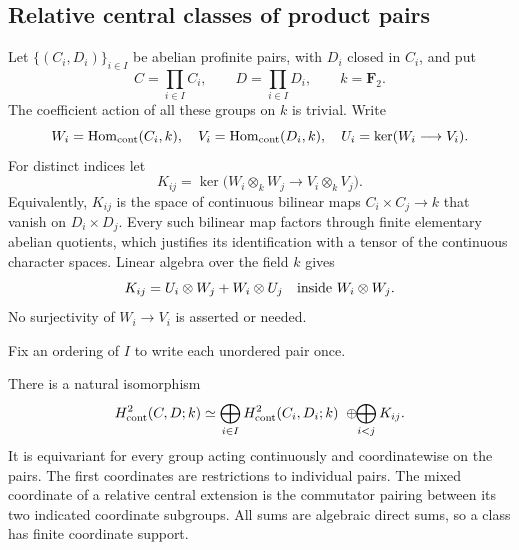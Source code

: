 \subsection{Relative central classes of product pairs}
\label{sec:cm-cross-prime-central}

Let \(\{(C_i,D_i)\}_{i\in I}\) be abelian profinite pairs, with
\(D_i\) closed in \(C_i\), and put
\[
 C=\prod_{i\in I}C_i,\qquad D=\prod_{i\in I}D_i,
 \qquad k=\mathbf F_2.
\]
The coefficient action of all these groups on \(k\) is trivial.
Write
\[
 W_i=\operatorname{Hom}_{\rm cont}(C_i,k),\quad
 V_i=\operatorname{Hom}_{\rm cont}(D_i,k),\quad
 U_i=\ker(W_i\longrightarrow V_i).
\]
For distinct indices let
\[
 K_{ij}=\ker\bigl(W_i\otimes_k W_j
                  \longrightarrow V_i\otimes_k V_j\bigr).
\]
Equivalently, \(K_{ij}\) is the space of continuous bilinear maps
\(C_i\times C_j\to k\) that vanish on \(D_i\times D_j\).
Every such bilinear map factors through finite elementary abelian
quotients, which justifies its identification with a tensor of the
continuous character spaces. Linear algebra over the field \(k\)
gives
\begin{equation}
 K_{ij}=U_i\otimes W_j+W_i\otimes U_j
               \quad\hbox{inside }W_i\otimes W_j.       \label{eq:cm-mixed-central-module}
\end{equation}
No surjectivity of \(W_i\to V_i\) is asserted or needed.

Fix an ordering of \(I\) to write each unordered pair once.

\begin{proposition}
\label{prop:cm-relative-product-cohomology}
There is a natural isomorphism
\begin{equation}
 H^2_{\rm cont}(C,D;k)
 \simeq
 \bigoplus_{i\in I}H^2_{\rm cont}(C_i,D_i;k)
 \ \oplus\!\!\bigoplus_{i<j}K_{ij}.                    \label{eq:cm-relative-product-cohomology}
\end{equation}
It is equivariant for every group acting continuously and
coordinatewise on the pairs. The first coordinates are restrictions
to individual pairs. The mixed coordinate of a relative central
extension is the commutator pairing between its two indicated
coordinate subgroups. All sums are algebraic direct sums, so a class
has finite coordinate support.
\end{proposition}

